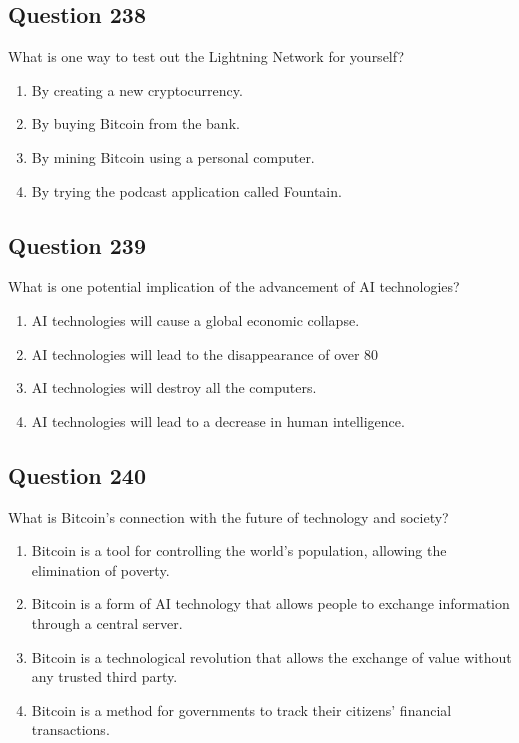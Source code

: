 \documentclass[12pt,a4paper]{article}
\begin{document}
\bigskip


\subsection*{Question 238}
What is one way to test out the Lightning Network for yourself?

\begin{enumerate}[label=\Alph*., leftmargin=*]
\item By creating a new cryptocurrency.
\item By buying Bitcoin from the bank.
\item By mining Bitcoin using a personal computer.
\item By trying the podcast application called Fountain.
\end{enumerate}

\bigskip


\subsection*{Question 239}
What is one potential implication of the advancement of AI technologies?

\begin{enumerate}[label=\Alph*., leftmargin=*]
\item AI technologies will cause a global economic collapse.
\item AI technologies will lead to the disappearance of over 80%
\item AI technologies will destroy all the computers.
\item AI technologies will lead to a decrease in human intelligence.
\end{enumerate}

\bigskip


\subsection*{Question 240}
What is Bitcoin's connection with the future of technology and society?

\begin{enumerate}[label=\Alph*., leftmargin=*]
\item Bitcoin is a tool for controlling the world's population, allowing the elimination of poverty.
\item Bitcoin is a form of AI technology that allows people to exchange information through a central server.
\item Bitcoin is a technological revolution that allows the exchange of value without any trusted third party.
\item Bitcoin is a method for governments to track their citizens' financial transactions.
\end{enumerate}
\end{document}
